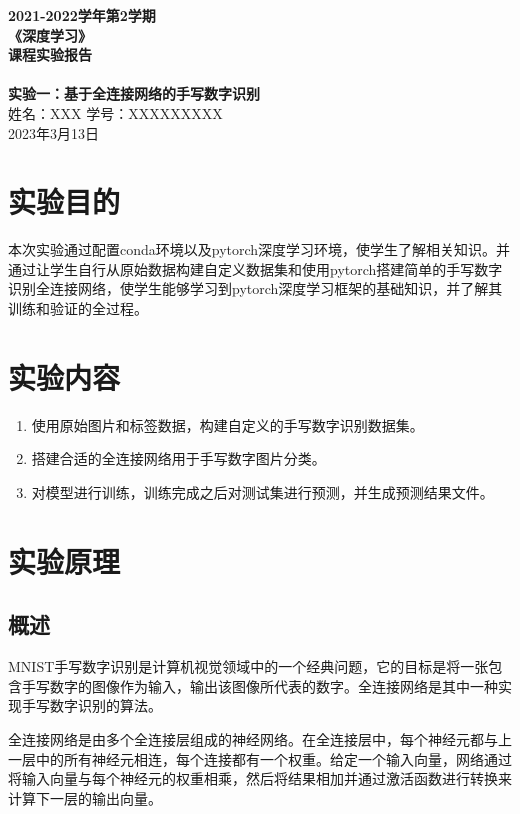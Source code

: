 \documentclass{report}
\begin{document}
	\begin{titlepage}
		\begin{center}
			{\LARGE \textbf{2021-2022学年第2学期\\《深度学习》\\课程实验报告\\ \quad \\ \textbf{实验一：基于全连接网络的手写数字识别}}}\\[2cm]
			{\Large 姓名：XXX \qquad 学号：XXXXXXXXX}\\[1cm]
			{\Large 2023年3月13日}\\[2cm]
		\end{center}
	\end{titlepage}

	\section{实验目的}
	本次实验通过配置conda环境以及pytorch深度学习环境，使学生了解相关知识。并通过让学生自行从原始数据构建自定义数据集和使用pytorch搭建简单的手写数字识别全连接网络，使学生能够学习到pytorch深度学习框架的基础知识，并了解其训练和验证的全过程。
	
	\section{实验内容}
	\begin{enumerate}
		\item 使用原始图片和标签数据，构建自定义的手写数字识别数据集。
		\item 搭建合适的全连接网络用于手写数字图片分类。
		\item 对模型进行训练，训练完成之后对测试集进行预测，并生成预测结果文件。
	\end{enumerate}
	
	
	\section{实验原理}
	\subsection{概述}
	MNIST手写数字识别是计算机视觉领域中的一个经典问题，它的目标是将一张包含手写数字的图像作为输入，输出该图像所代表的数字。全连接网络是其中一种实现手写数字识别的算法。
	
	全连接网络是由多个全连接层组成的神经网络。在全连接层中，每个神经元都与上一层中的所有神经元相连，每个连接都有一个权重。给定一个输入向量，网络通过将输入向量与每个神经元的权重相乘，然后将结果相加并通过激活函数进行转换来计算下一层的输出向量。
	
\end{document}

